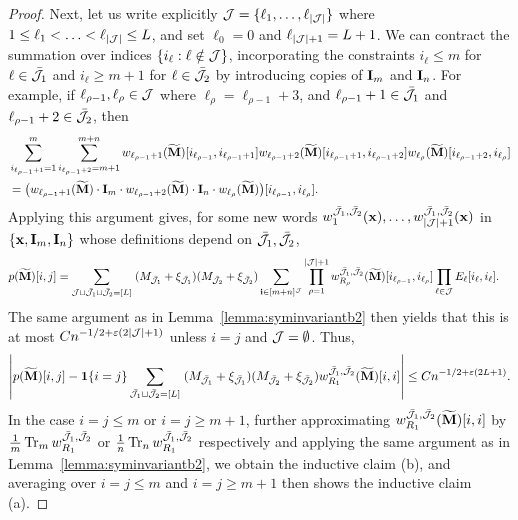 \documentclass[10pt,reqno]{amsart}
\def\x{\mathbf{x}}
\def\1{\mathbf{1}}
\def\bi{\mathbf{i}}
\def\eps{\varepsilon}
\def\Tr{\operatorname{Tr}}
\begin{document}
\begin{proof}
Next, let us write explicitly
$\mathcal{J}=\{\ell_1,\ldots,\ell_{|\mathcal{J}|}\}$ where $1 \leq \ell_1<\ldots<\ell_{|\mathcal{J}|}
\leq L$, and set $\ell_0=0$ and $\ell_{|\mathcal{J}|+1}=L+1$. 
We can contract the summation over indices 
$\{i_\ell:\ell\notin \mathcal{J}\}$, incorporating the constraints
$i_\ell \leq m$ for $\ell \in \bar{\mathcal{J}}_1$ and $i_\ell \geq m+1$ for $\ell \in
\bar{\mathcal{J}}_2$ by introducing copies of $\mathbf{I}_m$ and $\mathbf{I}_n$. For example, if
$\ell_{\rho-1},\ell_\rho \in \mathcal{J}$ where
$\ell_\rho=\ell_{\rho-1}+3$, and $\ell_{\rho-1}+1 \in \bar{\mathcal{J}}_1$
and $\ell_{\rho-1}+2 \in \bar{\mathcal{J}}_2$, then
\begin{align*}
&\sum_{i_{\ell_{\rho-1}+1}=1}^m \sum_{i_{\ell_{\rho-1}+2}=m+1}^{m+n}
w_{\ell_{\rho-1}+1}(\widetilde{\mathbf{M}})[i_{\ell_{\rho-1}},i_{\ell_{\rho-1}+1}]
w_{\ell_{\rho-1}+2}(\widetilde{\mathbf{M}})[i_{\ell_{\rho-1}+1},i_{\ell_{\rho-1}+2}]
w_{\ell_\rho}(\widetilde{\mathbf{M}})[i_{\ell_{\rho-1}+2},i_{\ell_\rho}]\\
&=\big(w_{\ell_{\rho-1}+1}(\widetilde{\mathbf{M}}) \cdot \mathbf{I}_m \cdot
w_{\ell_{\rho-1}+2}(\widetilde{\mathbf{M}}) \cdot \mathbf{I}_n
\cdot w_{\ell_\rho}(\widetilde{\mathbf{M}})\big)[i_{\ell_{\rho-1}},i_{\ell_\rho}].
\end{align*}
Applying this argument gives, for some new words
$w_1^{\bar\cJ_1,\bar\cJ_2}(\x),\ldots,w_{|\cJ|+1}^{\bar\cJ
_1,\bar\cJ_2}(\x)$ in $\{\x,\bI_m,\bI_n\}$
whose definitions depend on $\bar{\mathcal{J}}_1,\bar{\mathcal{J}}_2$,
\begin{align*}
	p(\widetilde\bM)[i,j] &= \sum_{\cJ \sqcup \bar\cJ_1 \sqcup \bar\cJ_2=[L]} \;
	(M_{\bar\cJ_1} + \xi_{\bar\cJ_1}) (M_{\bar\cJ_2} + \xi_{\bar\cJ_2})
	\sum_{\bi \in [m+n]^{\cJ}} \prod_{\rho=1}^{|\cJ|+1}
	w_{R_\rho}^{\bar\cJ_1,\bar\cJ_2}(\widetilde \bM)[i_{\ell_{\rho-1}},i_{\ell_\rho}] \prod_{\ell \in \cJ} 
	E_\ell[i_\ell,i_\ell].
\end{align*}
The same argument as in Lemma~\ref{lemma:syminvariantb2} then yields that this
is at most $Cn^{-1/2+\eps(2|\cJ|+1)}$ unless $i=j$ and $\mathcal{J}=\emptyset$. Thus,
\[\left|p(\widetilde{\bM})[i,j]-\1\{i=j\}
\sum_{\bar\cJ_1 \sqcup \bar\cJ_2=[L]} \;
(M_{\bar\cJ_1} + \xi_{\bar\cJ_1}) (M_{\bar\cJ_2} + \xi_{\bar\cJ_2})
w_{R_1}^{\bar\cJ_1,\bar\cJ_2}(\widetilde\bM)[i,i]\right| \leq
Cn^{-1/2+\eps(2L+1)}.\]
In the case $i=j \leq m$ or $i=j \geq m+1$, further approximating
$w_{R_1}^{\bar{\mathcal{J}}_1,\bar{\mathcal{J}}_2}(\widetilde{\mathbf{M}})[i,i]$
by $\frac{1}{m}\Tr_m w_{R_1}^{\bar\cJ_1,\bar\cJ_2}$
or $\frac{1}{n}\Tr_n w_{R_1}^{\bar\cJ_1,\bar\cJ_2}$ respectively
and applying the same argument as in Lemma~\ref{lemma:syminvariantb2},
we obtain the inductive claim (b), and averaging over $i=j \leq m$ and $i=j
\geq m+1$ then shows the inductive claim (a).
\end{proof}
\end{document}

